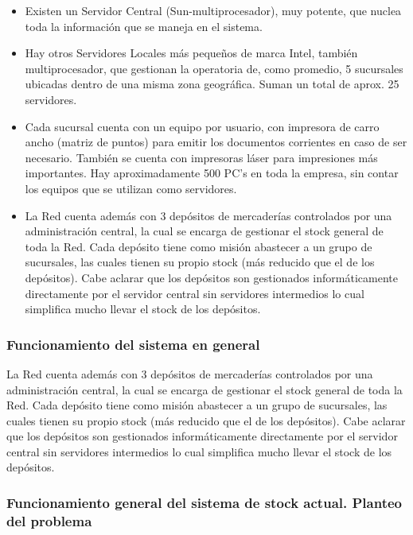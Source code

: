 \begin{itemize}

  \item Existen un Servidor Central (Sun-multiprocesador), muy potente, que
    nuclea toda la información que se maneja en el sistema.

  \item Hay otros Servidores Locales más pequeños de marca Intel, también
    multiprocesador, que gestionan la operatoria de, como promedio, 5 sucursales
    ubicadas dentro de una misma zona geográfica. Suman un total de aprox. 25
    servidores.

  \item Cada sucursal cuenta con un equipo por usuario, con impresora de carro
    ancho (matriz de puntos) para emitir los documentos corrientes en caso de ser
    necesario. También se cuenta con impresoras láser para impresiones más
    importantes. Hay aproximadamente 500 PC’s en toda la empresa, sin contar los
    equipos que se utilizan como servidores.

  \item La Red cuenta además con 3 depósitos de mercaderías controlados por una
    administración central, la cual se encarga de gestionar el stock general de
    toda la Red. Cada depósito tiene como misión abastecer a un grupo de
    sucursales, las cuales tienen su propio stock (más reducido que el de los
    depósitos). Cabe aclarar que los depósitos son gestionados informáticamente
    directamente por el servidor central sin servidores intermedios lo cual
    simplifica mucho llevar el stock de los depósitos.

\end{itemize}


\subsubsection{Funcionamiento del sistema en general}

La Red cuenta además con 3 depósitos de mercaderías controlados por una
administración central, la cual se encarga de gestionar el stock general de
toda la Red. Cada depósito tiene como misión abastecer a un grupo de
sucursales, las cuales tienen su propio stock (más reducido que el de los
depósitos). Cabe aclarar que los depósitos son gestionados informáticamente
directamente por el servidor central sin servidores intermedios lo cual
simplifica mucho llevar el stock de los depósitos.


\subsubsection{Funcionamiento general del sistema de stock actual. Planteo del
problema}

